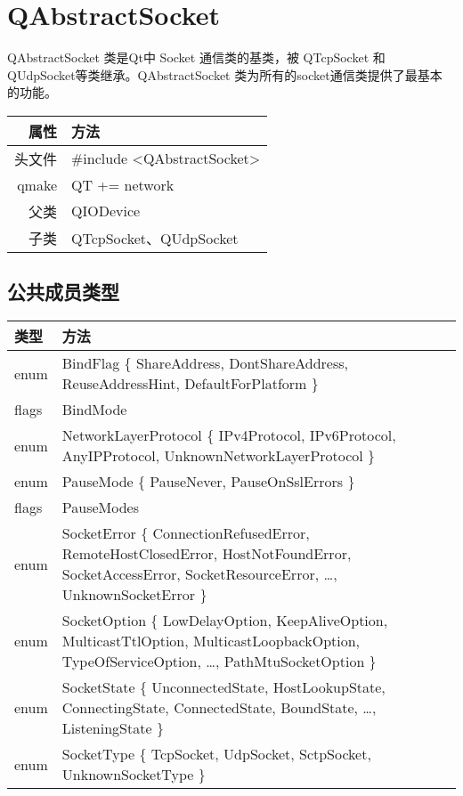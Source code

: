 \chapter{QAbstractSocket}

QAbstractSocket 类是Qt中 Socket 通信类的基类，被 QTcpSocket 和
QUdpSocket等类继承。QAbstractSocket 类为所有的socket通信类提供了最基本
的功能。

\begin{tabular}{|r|l|}
	\hline
	属性 & 方法 \\
  \hline
	头文件 & \#include <QAbstractSocket>\\      
	\hline
	qmake & QT += network\\      
	\hline
	父类 & QIODevice\\
	\hline
	子类 & QTcpSocket、QUdpSocket \\
	\hline
\end{tabular}

\section{公共成员类型}

\begin{tabular}{|m{5em}|m{35em}|}
\hline
类型&方法 \\ 
\hline
enum&	BindFlag \{ ShareAddress, DontShareAddress, ReuseAddressHint,
      DefaultForPlatform \}\\
\hline
flags&	BindMode\\
\hline
enum&	NetworkLayerProtocol \{ IPv4Protocol, IPv6Protocol, AnyIPProtocol, UnknownNetworkLayerProtocol \}\\
\hline
enum&	PauseMode \{ PauseNever, PauseOnSslErrors \}\\
\hline
flags&	PauseModes\\
\hline
enum&	SocketError \{ ConnectionRefusedError, RemoteHostClosedError, HostNotFoundError, SocketAccessError, SocketResourceError, …, UnknownSocketError \}\\
\hline
enum&	SocketOption \{ LowDelayOption, KeepAliveOption, MulticastTtlOption, MulticastLoopbackOption, TypeOfServiceOption, …, PathMtuSocketOption \}\\
\hline
enum&	SocketState \{ UnconnectedState, HostLookupState, ConnectingState, ConnectedState, BoundState, …, ListeningState \}\\
\hline
enum&	SocketType \{ TcpSocket, UdpSocket, SctpSocket, UnknownSocketType \}\\
  \hline
\end{tabular}

